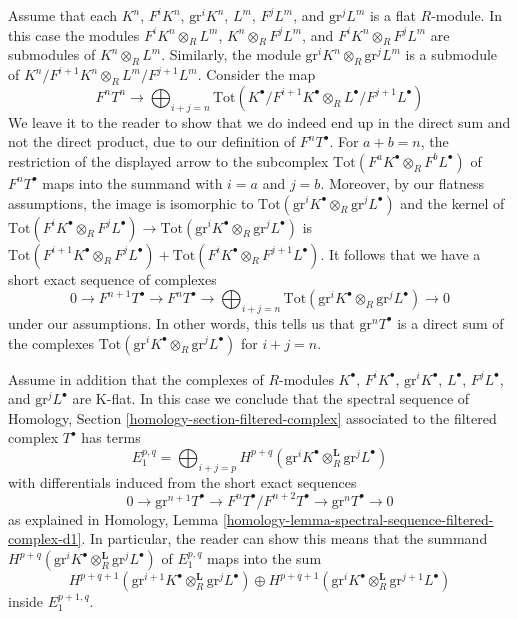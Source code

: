 \medskip\noindent
Assume that each $K^n$, $F^iK^n$, $\text{gr}^iK^n$, $L^m$, $F^jL^m$, and
$\text{gr}^jL^m$ is a flat $R$-module. In this case the modules
$F^iK^n \otimes_R L^m$, $K^n \otimes_R F^jL^m$, and $F^iK^n \otimes_R F^jL^m$
are submodules of $K^n \otimes_R L^m$. Similarly, the module
$\text{gr}^iK^n \otimes_R \text{gr}^jL^m$ is a submodule
of $K^n/F^{i + 1}K^n \otimes_R L^m/F^{j + 1}L^m$.
Consider the map
$$
F^nT^n \longrightarrow
\bigoplus\nolimits_{i + j = n}
\text{Tot}(K^\bullet / F^{i + 1}K^\bullet
\otimes_R L^\bullet / F^{j + 1}L^\bullet)
$$
We leave it to the reader to show that we do indeed end up in the direct
sum and not the direct product, due to our definition of $F^nT^\bullet$.
For $a + b = n$, the restriction of the displayed arrow to the subcomplex
$\text{Tot}(F^aK^\bullet \otimes_R F^bL^\bullet)$ of $F^nT^\bullet$
maps into the summand with $i = a$ and $j = b$.
Moreover, by our flatness assumptions, the image is isomorphic to
$\text{Tot}(\text{gr}^iK^\bullet \otimes_R \text{gr}^jL^\bullet)$
and the kernel of $\text{Tot}(F^iK^\bullet \otimes_R F^jL^\bullet) \to
\text{Tot}(\text{gr}^iK^\bullet \otimes_R \text{gr}^jL^\bullet)$ is
$\text{Tot}(F^{i + 1}K^\bullet \otimes_R F^jL^\bullet) +
\text{Tot}(F^iK^\bullet \otimes_R F^{j + 1}L^\bullet)$.
It follows that we have a short exact sequence of complexes
$$
0 \to F^{n + 1}T^\bullet \to F^nT^\bullet \to
\bigoplus\nolimits_{i + j = n}
\text{Tot}(\text{gr}^iK^\bullet \otimes_R \text{gr}^jL^\bullet) \to 0
$$
under our assumptions. In other words, this tells us that
$\text{gr}^nT^\bullet$ is a direct sum of the complexes
$\text{Tot}(\text{gr}^iK^\bullet \otimes_R \text{gr}^jL^\bullet)$
for $i + j = n$.

\medskip\noindent
Assume in addition that the complexes of $R$-modules
$K^\bullet$, $F^iK^\bullet$, $\text{gr}^iK^\bullet$, $L^\bullet$,
$F^jL^\bullet$, and $\text{gr}^jL^\bullet$ are K-flat.
In this case we conclude that the spectral sequence of
Homology, Section \ref{homology-section-filtered-complex}
associated to the filtered complex $T^\bullet$ has terms
$$
E_1^{p, q} =
\bigoplus\nolimits_{i + j = p}
H^{p + q}(\text{gr}^iK^\bullet \otimes_R^\mathbf{L} \text{gr}^jL^\bullet)
$$
with differentials induced from the short exact sequences
$$
0 \to \text{gr}^{n + 1}T^\bullet \to
F^nT^\bullet/F^{n + 2}T^\bullet \to
\text{gr}^nT^\bullet \to 0
$$
as explained in Homology, Lemma
\ref{homology-lemma-spectral-sequence-filtered-complex-d1}.
In particular, the reader can show this means that the summand
$H^{p + q}(\text{gr}^iK^\bullet \otimes_R^\mathbf{L} \text{gr}^jL^\bullet)$
of $E_1^{p, q}$ maps into the sum
$$
H^{p + q + 1}(\text{gr}^{i + 1}K^\bullet \otimes_R^\mathbf{L}
\text{gr}^jL^\bullet) \oplus
H^{p + q + 1}(\text{gr}^iK^\bullet \otimes_R^\mathbf{L}
\text{gr}^{j + 1}L^\bullet)
$$
inside $E_1^{p + 1, q}$.


